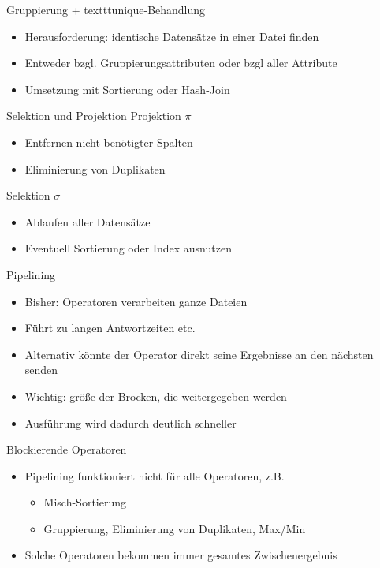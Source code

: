 \documentclass{article}
\begin{document}
\begin{block}{Gruppierung + texttt{unique}-Behandlung}
  \begin{itemize}
    \item Herausforderung: identische Datensätze in einer Datei finden
    \item Entweder bzgl. Gruppierungsattributen oder bzgl aller Attribute
    \item Umsetzung mit Sortierung oder Hash-Join
  \end{itemize}
\end{block}

\begin{block}{Selektion und Projektion}
  Projektion $\pi$
  \begin{itemize}
    \item Entfernen nicht benötigter Spalten
    \item Eliminierung von Duplikaten
  \end{itemize}
  Selektion $\sigma$
  \begin{itemize}
    \item Ablaufen aller Datensätze
    \item Eventuell Sortierung oder Index ausnutzen
  \end{itemize}
\end{block}

\begin{block}{Pipelining}
  \begin{itemize}
    \item Bisher: Operatoren verarbeiten ganze Dateien
    \item Führt zu langen Antwortzeiten etc.
    \item Alternativ könnte der Operator direkt seine Ergebnisse an den nächsten senden
    \item Wichtig: größe der Brocken, die weitergegeben werden
    \item Ausführung wird dadurch deutlich schneller
  \end{itemize}
\end{block}

\begin{block}{Blockierende Operatoren}
  \begin{itemize}
    \item Pipelining funktioniert nicht für alle Operatoren, z.B.
    \begin{itemize}
      \item Misch-Sortierung
      \item Gruppierung, Eliminierung von Duplikaten, Max/Min
    \end{itemize}
    \item Solche Operatoren bekommen immer gesamtes Zwischenergebnis
  \end{itemize}
\end{block}
\end{document}
